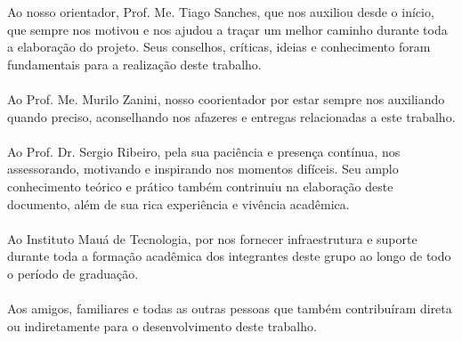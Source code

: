 \begin{agradecimentos}
        Ao nosso orientador, Prof. Me. Tiago Sanches, que nos auxiliou desde o início, que sempre nos motivou e nos ajudou a traçar um melhor caminho durante toda a elaboração do projeto. Seus conselhos, críticas, ideias e conhecimento foram fundamentais para a realização deste trabalho.
        \\\\
        Ao Prof. Me. Murilo Zanini, nosso coorientador por estar sempre nos auxiliando quando preciso, aconselhando nos afazeres e entregas relacionadas a este trabalho.
        \\\\
        Ao Prof. Dr. Sergio Ribeiro, pela sua paciência e presença contínua, nos assessorando, motivando e inspirando nos momentos difíceis. Seu amplo conhecimento teórico e prático também contrinuiu na elaboração deste documento, além de sua rica experiência e vivência acadêmica. 
        \\\\
        Ao Instituto Mauá de Tecnologia, por nos fornecer infraestrutura e suporte durante toda a formação acadêmica dos integrantes deste grupo ao longo de todo o período de graduação.
        \\\\
        Aos amigos, familiares e todas as outras pessoas que também contribuíram direta ou indiretamente para o desenvolvimento deste trabalho.
\end{agradecimentos}

